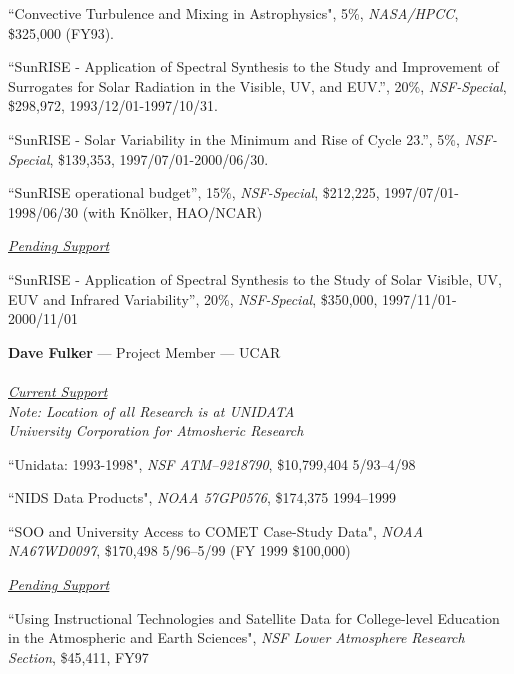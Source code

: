 \documentclass[12pt]{article}
\begin{document}
\Hpar ``Convective Turbulence and Mixing in Astrophysics", 5\%,
{\em  NASA/HPCC}, \$325,000 (FY93). 

\Hpar ``SunRISE - Application of Spectral Synthesis to the Study and
Improvement of Surrogates for Solar Radiation in the Visible, UV, and EUV.'',
20\%, {\em NSF-Special}, \$298,972, 1993/12/01-1997/10/31. 

\Hpar ``SunRISE - Solar Variability in the Minimum and Rise of Cycle 23.'',
5\%, {\em NSF-Special}, \$139,353, 1997/07/01-2000/06/30.

\Hpar ``SunRISE operational budget'', 15\%, {\em NSF-Special}, \$212,225,
1997/07/01-1998/06/30 (with  Kn\"olker, HAO/NCAR)

\begin{center}
\underline {\large \em Pending Support}
\end{center}

\Hpar ``SunRISE - Application of Spectral Synthesis to the Study of 
Solar Visible, UV, EUV and Infrared Variability'', 20\%, 
{\em NSF-Special}, \$350,000, 1997/11/01-2000/11/01

\bigskip

\begin{center}
{\large {\bf Dave Fulker} --- Project Member --- UCAR \\
\ \\
\vspace{.08in} \underline {\it Current Support}}\\
\vspace{.08in} {\small {\it Note:  Location of all Research is at
    UNIDATA\\University Corporation for Atmosheric Research}}
\end{center}

\Hpar ``Unidata: 1993-1998", {\em NSF ATM--9218790}, \$10,799,404 5/93--4/98 

\Hpar ``NIDS Data Products", {\em NOAA 57GP0576}, \$174,375 1994--1999

\Hpar ``SOO and University Access to COMET Case-Study Data", {\em NOAA
NA67WD0097}, \$170,498 5/96--5/99 (FY 1999 \$100,000)

\begin{center}
{\large \underline {\it Pending Support}}
\end{center}

\Hpar ``Using Instructional Technologies and Satellite Data for
College-level Education in the Atmospheric and Earth Sciences", {\em NSF
Lower Atmosphere Research Section}, \$45,411, FY97
\end{document}
